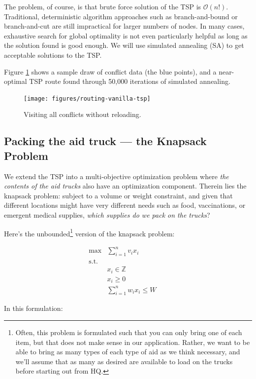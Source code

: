 \documentclass{article} %
\begin{document}
The problem, of course, is that brute force solution of the TSP is $\mathcal{O}$$(n!)$. Traditional, deterministic
algorithm approaches such as branch-and-bound or branch-and-cut are still impractical for larger numbers of nodes.
In many cases, exhaustive search for global optimality is not even particularly helpful as long as the solution
found is good enough. We will use simulated annealing (SA) to get acceptable solutions to the TSP.

Figure \ref{fig:routing-vanilla-tsp} shows a sample draw of conflict data (the blue points), and a near-optimal TSP route found through 50,000 iterations of simulated annealing.

\begin{figure}
  \centering
  \texttt{[image: figures/routing-vanilla-tsp]}
  \caption{Visiting all conflicts without reloading.}
  \label{fig:routing-vanilla-tsp}
\end{figure}

\subsection{Packing the aid truck --- the Knapsack Problem}

We extend the TSP into a multi-objective optimization problem
where \emph{the contents of the aid trucks} also have an optimization component. Therein lies
the knapsack problem: subject to a volume or weight constraint, and given that different locations
might have very different needs such as food, vaccinations, or emergent medical supplies, \emph{which
supplies do we pack on the trucks}?

Here's the unbounded\footnote{Often, this problem is formulated such that you can only bring one of each item, but that does not make sense in our application. Rather, we want to be able to bring as many types of each type of aid as we think necessary, and we'll assume that as many as desired are available to load on the trucks before starting out from HQ.} version of the knapsack problem:

\begin{align*}
\max &\sum_{i=1}^n v_i x_i &&  \\
\mathrm{s.t.} & \\
    & x_i \in \mathbb{Z} \\
    & x_i \geq 0 \\
	& \sum_{i=1}^n w_ix_i \leq W
\end{align*}

In this formulation:
\end{document}
